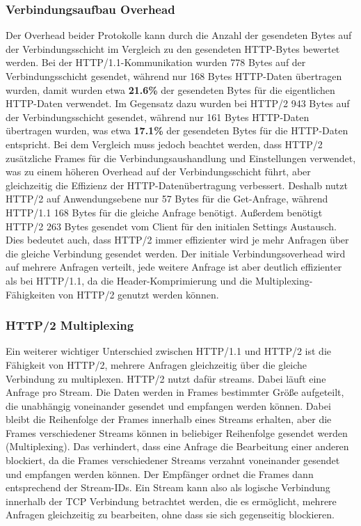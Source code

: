 \subsubsection*{Verbindungsaufbau Overhead}

Der Overhead beider Protokolle kann durch die Anzahl der gesendeten Bytes auf der Verbindungsschicht im Vergleich zu den gesendeten HTTP-Bytes bewertet werden.
Bei der HTTP/1.1-Kommunikation wurden 778 Bytes auf der Verbindungsschicht gesendet, während nur 168 Bytes HTTP-Daten übertragen wurden, damit wurden etwa \textbf{21.6\%} der gesendeten Bytes für die eigentlichen HTTP-Daten verwendet.
Im Gegensatz dazu wurden bei HTTP/2 943 Bytes auf der Verbindungsschicht gesendet, während nur 161 Bytes HTTP-Daten übertragen wurden, was etwa \textbf{17.1\%} der gesendeten Bytes für die HTTP-Daten entspricht.
Bei dem Vergleich muss jedoch beachtet werden, dass HTTP/2 zusätzliche Frames für die Verbindungsaushandlung und Einstellungen verwendet, was zu einem höheren Overhead auf der Verbindungsschicht führt, aber gleichzeitig die Effizienz der HTTP-Datenübertragung verbessert.
Deshalb nutzt HTTP/2 auf Anwendungsebene nur 57 Bytes für die Get-Anfrage, während HTTP/1.1 168 Bytes für die gleiche Anfrage benötigt.
Außerdem benötigt HTTP/2 263 Bytes gesendet vom Client für den initialen Settings Austausch.
Dies bedeutet auch, dass HTTP/2 immer effizienter wird je mehr Anfragen über die gleiche Verbindung gesendet werden.
Der initiale Verbindungsoverhead wird auf mehrere Anfragen verteilt, jede weitere Anfrage ist aber deutlich effizienter als bei HTTP/1.1, da die Header-Komprimierung und die Multiplexing-Fähigkeiten von HTTP/2 genutzt werden können.

\subsubsection*{HTTP/2 Multiplexing}
Ein weiterer wichtiger Unterschied zwischen HTTP/1.1 und HTTP/2 ist die Fähigkeit von HTTP/2, mehrere Anfragen gleichzeitig über die gleiche Verbindung zu multiplexen.
HTTP/2 nutzt dafür streams.
Dabei läuft eine Anfrage pro Stream.
Die Daten werden in Frames bestimmter Größe aufgeteilt, die unabhängig voneinander gesendet und empfangen werden können.
Dabei bleibt die Reihenfolge der Frames innerhalb eines Streams erhalten, aber die Frames verschiedener Streams können in beliebiger Reihenfolge gesendet werden (Multiplexing).
Das verhindert, dass eine Anfrage die Bearbeitung einer anderen blockiert, da die Frames verschiedener Streams verzahnt voneinander gesendet und empfangen werden können.
Der Empfänger ordnet die Frames dann entsprechend der Stream-IDs.
Ein Stream kann also als logische Verbindung innerhalb der TCP Verbindung betrachtet werden, die es ermöglicht, mehrere Anfragen gleichzeitig zu bearbeiten, ohne dass sie sich gegenseitig blockieren.

